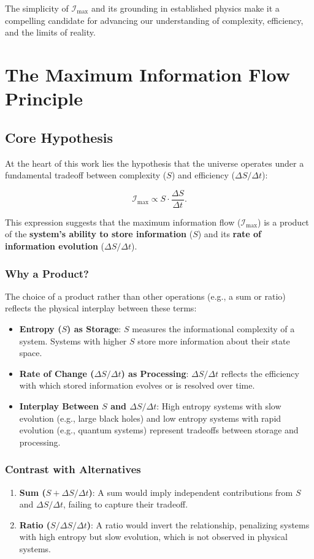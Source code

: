 \documentclass[12pt]{article}
\begin{document}
The simplicity of \( \mathcal{I}_{\text{max}} \) and its grounding in established physics make it a compelling candidate for advancing our understanding of complexity, efficiency, and the limits of reality.


\section{The Maximum Information Flow Principle}

\subsection{Core Hypothesis}
At the heart of this work lies the hypothesis that the universe operates under a fundamental tradeoff between complexity (\( S \)) and efficiency (\( \Delta S / \Delta t \)):

\[
\mathcal{I}_{\text{max}} \propto S \cdot \frac{\Delta S}{\Delta t}.
\]

This expression suggests that the maximum information flow (\( \mathcal{I}_{\text{max}} \)) is a product of the \textbf{system’s ability to store information} (\( S \)) and its \textbf{rate of information evolution} (\( \Delta S / \Delta t \)).

\subsubsection{Why a Product?}
The choice of a product rather than other operations (e.g., a sum or ratio) reflects the physical interplay between these terms:
\begin{itemize}
    \item \textbf{Entropy (\( S \)) as Storage}:
    \( S \) measures the informational complexity of a system. Systems with higher \( S \) store more information about their state space.
    \item \textbf{Rate of Change (\( \Delta S / \Delta t \)) as Processing}:
    \( \Delta S / \Delta t \) reflects the efficiency with which stored information evolves or is resolved over time.
    \item \textbf{Interplay Between \( S \) and \( \Delta S / \Delta t \)}:
    High entropy systems with slow evolution (e.g., large black holes) and low entropy systems with rapid evolution (e.g., quantum systems) represent tradeoffs between storage and processing.
\end{itemize}

\subsubsection{Contrast with Alternatives}
\begin{enumerate}
    \item \textbf{Sum (\( S + \Delta S / \Delta t \))}:
    A sum would imply independent contributions from \( S \) and \( \Delta S / \Delta t \), failing to capture their tradeoff.
    \item \textbf{Ratio (\( S / \Delta S / \Delta t \))}:
    A ratio would invert the relationship, penalizing systems with high entropy but slow evolution, which is not observed in physical systems.
\end{enumerate}
\end{document}
